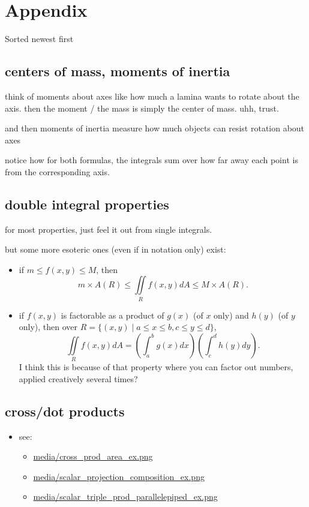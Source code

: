 \documentclass[11pt]{article}
\theoremstyle{definition}
\newcommand{\addsection}[1]{\section*{#1}\addcontentsline{toc}{section}{#1}} %
\newcommand{\col}[1]{\begin{minipage}{\columnwidth}#1\end{minipage}}
\begin{document}


\newpage
\addsection{Appendix} 
Sorted newest first

\subsection*{centers of mass, moments of inertia}
think of moments about axes like how much a lamina wants to rotate about the axis. then the moment / the mass is simply the center of mass. uhh, trust.

and then moments of inertia measure how much objects can resist rotation about axes

notice how for both formulas, the integrals sum over how far away each point is from the corresponding axis.
\subsection*{double integral properties}
for most properties, just feel it out from single integrals.

but some more esoteric ones (even if in notation only) exist:
\begin{itemize}
  \item if $m \le f(x,y) \le M$, then
  \[ m\times A(R) \le \iint\limits_R f(x,y)dA \le M \times A(R).\]
  \item if $f(x,y)$ is factorable as a product of $g(x)$ (of $x$ only) and $h(y)$ (of $y$ only), then over $R = \{(x,y) \mid a\le x\le b, c\le y\le d\}$,
  \[\iint\limits_R f(x,y)dA  = \left(\int_{a}^{b}g(x)dx\right)\left(\int_{c}^{d}h(y)dy\right).\]
  I think this is because of that property where you can factor out numbers, applied creatively several times?
\end{itemize}

\subsection*{cross/dot products}
\begin{itemize}
  \item see:
  \begin{itemize}
    \item \url{media/cross_prod_area_ex.png}
    \item \url{media/scalar_projection_composition_ex.png}
    \item \url{media/scalar_triple_prod_parallelepiped_ex.png}
  \end{itemize}
\end{itemize}
\end{document}
